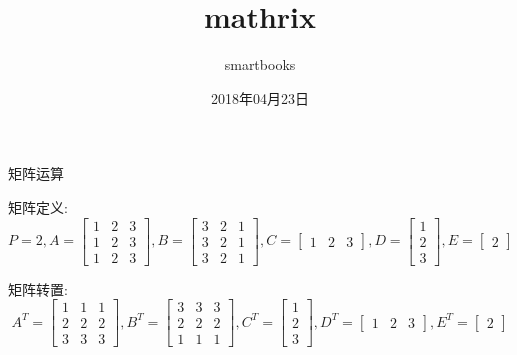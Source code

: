 \documentclass[UTF8,a4paper,notitlepage,openany,plain,final]{ctexbook}
\author{smartbooks}
\title{mathrix}
\date{2018年04月23日}
\begin{document}
    \begin{center}
        \Large 矩阵运算
    \end{center}

    \columnseprule=1pt
    \begin{multicols}{4}
    \end{multicols}

    矩阵定义:
    \[
        P = 2 , A =
        \begin{bmatrix}
            1 & 2 & 3 \\
            1 & 2 & 3 \\
            1 & 2 & 3
        \end{bmatrix}
        , B =
        \begin{bmatrix}
            3 & 2 & 1 \\
            3 & 2 & 1 \\
            3 & 2 & 1
        \end{bmatrix}
        , C =
        \begin{bmatrix}
            1 & 2 & 3
        \end{bmatrix}
        , D =
        \begin{bmatrix}
            1\\
            2\\
            3
        \end{bmatrix}
        , E =
        \begin{bmatrix}
            2
        \end{bmatrix}
    \]
    
    矩阵转置:
    \[
        A^T =
        \begin{bmatrix}
            1 & 1 & 1 \\
            2 & 2 & 2 \\
            3 & 3 & 3
        \end{bmatrix}
        , B^T =
        \begin{bmatrix}
            3 & 3 & 3 \\
            2 & 2 & 2 \\
            1 & 1 & 1
        \end{bmatrix}
        , C^T =
        \begin{bmatrix}
            1 \\
            2 \\
            3
        \end{bmatrix}
        , D^T =
        \begin{bmatrix}
            1 & 2 & 3
        \end{bmatrix}
        , E^T =
        \begin{bmatrix}
            2
        \end{bmatrix}
    \]
\end{document}
